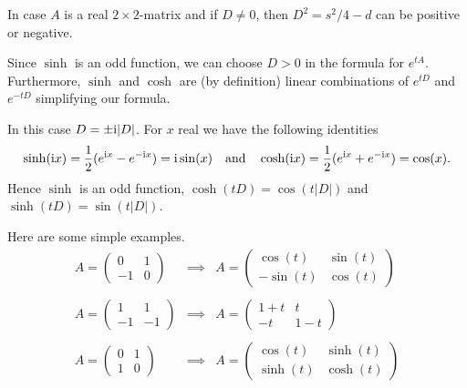 In case $A$ is a real $2 \times2$-matrix and if $ D \neq 0 $, then 
$ D^{2} = s^{2}/4 - d $ can be positive or negative. 
\begin{description}[wide,  labelindent=0em]

\item[$D^2 > 0$: ]
Since $ \sinh $  is an odd function, we can choose  $ D > 0 $ in the formula for $ e^{tA} $.
Furthermore, $ \sinh $ and $ \cosh $ are (by definition) linear combinations of $ e^{tD} $ and 
$ e^{-tD} $ simplifying our formula.

\item[$D^2 < 0$: ] 
In this case $D = \pm \mathrm{i}|D|$.
For $ x $ real we have the following identities
%
\[
	\sinh(\mathrm{i} x) = \frac{1}{2}( e^{\mathrm{i} x} - e^{-\mathrm{i} x}) = \mathrm{i} \sin(x)
	\quad \text{and} \quad
	\cosh(\mathrm{i} x) = \frac{1}{2}( e^{ \mathrm{i} x} + e^{- \mathrm{i} x}) = \cos(x). 
\]
%
Hence $ \sinh $ is an odd function,  $\cosh(tD) = \cos(t|D|)$ and $\sinh(tD) = \sin(t|D|)$.
\end{description}
Here are some simple examples.
\newcommand{\ABC}{A = \begin{pmatrix}	0 & 1 \\ -1 & 0	\end{pmatrix}}
\newcommand{\BBC}{A = \begin{pmatrix}	\cos(t) & \sin(t) \\ - \sin(t) & \cos(t) \end{pmatrix}}
\newcommand{\CBC}{A = \begin{pmatrix}	1 & 1 \\ -1 & -1 \end{pmatrix}}
\newcommand{\DBC}{A = \begin{pmatrix}	1+t & t \\ - t & 1-t \end{pmatrix}}
\newcommand{\EBC}{A = \begin{pmatrix}	0 & 1 \\ 1 &0 \end{pmatrix}}
\newcommand{\FBC}{A = \begin{pmatrix}	\cos(t) & \sinh(t) \\ \sinh(t) & \cosh(t) \end{pmatrix}}
\[
  \begin{array}{lll}
    \ABC & \implies & \BBC \\\\
    \CBC & \implies & \DBC \\\\ 
    \EBC & \implies & \FBC  
  \end{array}
\]
